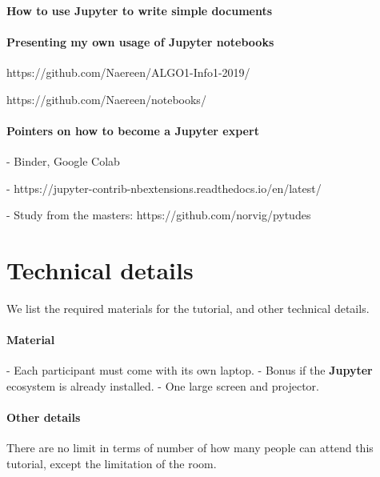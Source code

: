 \documentclass[runningheads]{llncs}
\newcommand{\Jupyter}{\textbf{Jupyter}}
\begin{document}
\paragraph{How to use \Jupyter{} to write simple documents}

\paragraph{Presenting my own usage of \Jupyter{} notebooks}

https://github.com/Naereen/ALGO1-Info1-2019/

https://github.com/Naereen/notebooks/


\paragraph{Pointers on how to become a \Jupyter{} expert}

- Binder, Google Colab

- https://jupyter-contrib-nbextensions.readthedocs.io/en/latest/

- Study from the masters: https://github.com/norvig/pytudes


\section{Technical details}

We list the required materials for the tutorial, and other technical details.

\paragraph{Material}

- Each participant must come with its own laptop.
- Bonus if the \Jupyter{} ecosystem is already installed.
- One large screen and projector.


\paragraph{Other details}

There are no limit in terms of number of how many people can attend this tutorial, except the limitation of the room.
\end{document}
